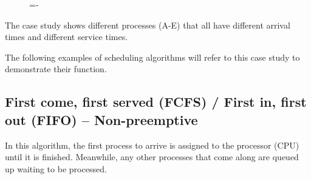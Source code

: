 \documentclass[a4paper]{systems-software}
\begin{document}
\begin{figure}[H]
  \lineskip=-\fboxrule
\end{figure}

The case study shows different processes (A-E) that all have different arrival times and different service times.

The following examples of scheduling algorithms will refer to this case study to demonstrate their function.


\subsection*{First come, first served (FCFS) / First in, first out (FIFO) – Non-preemptive}

In this algorithm, the first process to arrive is assigned to the processor (CPU) until it is finished. Meanwhile, any other processes that come along are queued up waiting to be processed.
\end{document}
